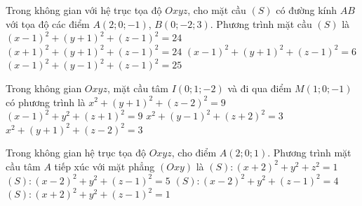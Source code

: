 \begin{ex}%
	Trong không gian với hệ trục tọa độ $Oxyz$, cho mặt cầu $(S)$ có đường kính $AB$  với tọa độ các điểm $A\left(2;0;-1\right)$, $B\left(0;-2;3\right)$. Phương trình mặt cầu $(S)$ là
	 \choice
		{$\left(x-1\right)^2+\left(y+1\right)^2+\left(z-1\right)^2=24$} 
		 {$\left(x+1\right)^2+\left(y+1\right)^2+\left(z-1\right)^2=24$}
		{\True $\left(x-1\right)^2+\left(y+1\right)^2+\left(z-1\right)^2=6$} 
		 {$\left(x-1\right)^2+\left(y-1\right)^2+\left(z-1\right)^2=25$}
\end{ex}

\begin{ex}%
	Trong không gian $Oxyz$, mặt cầu tâm $I\left(0;1;-2\right)$ và đi qua điểm $M\left(1;0;-1\right)$  có phương trình là
	 \choice
		 {$x^2+\left(y+1\right)^2+\left(z-2\right)^2=9$}
		{$\left(x-1\right)^2+y^2+\left(z+1\right)^2=9$} 
		 {\True $x^2+\left(y-1\right)^2+\left(z+2\right)^2=3$}
		{$x^2+\left(y+1\right)^2+\left(z-2\right)^2=3$} 
\end{ex}

\begin{ex}%
	Trong không gian hệ trục tọa độ $Oxyz$, cho điểm $A\left(2;0;1\right)$. Phương trình mặt cầu tâm $A$ tiếp xúc với mặt phẳng $\left(Oxy\right)$ là 
	 \choice
		 {$(S)\colon{\left(x+2\right)^2}+y^2+z^2=1$}
		 {$(S)\colon{\left(x-2\right)^2}+y^2+\left(z-1\right)^2=5$}
		{$(S)\colon{\left(x-2\right)^2}+y^2+\left(z-1\right)^2=4$} 
		 {\True $(S)\colon{\left(x+2\right)^2}+y^2+\left(z-1\right)^2=1$}
\end{ex}

